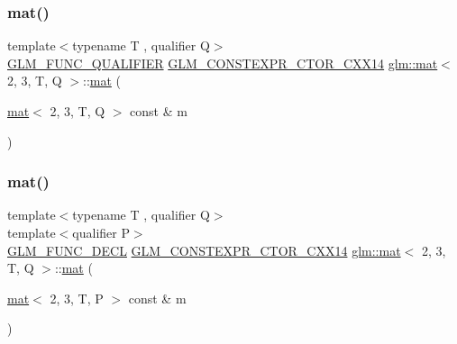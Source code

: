\subsubsection{\texorpdfstring{mat()}{mat()}\hspace{0.1cm}{\footnotesize\ttfamily [2/21]}}
{\footnotesize\ttfamily template$<$typename T , qualifier Q$>$ \\
\hyperlink{setup_8hpp_a33fdea6f91c5f834105f7415e2a64407}{G\+L\+M\+\_\+\+F\+U\+N\+C\+\_\+\+Q\+U\+A\+L\+I\+F\+I\+ER} \hyperlink{setup_8hpp_a0900f9145e68bf6061b6f5e7be3fa751}{G\+L\+M\+\_\+\+C\+O\+N\+S\+T\+E\+X\+P\+R\+\_\+\+C\+T\+O\+R\+\_\+\+C\+X\+X14} \hyperlink{structglm_1_1mat}{glm\+::mat}$<$ 2, 3, T, Q $>$\+::\hyperlink{structglm_1_1mat}{mat} (\begin{DoxyParamCaption}\item[{\hyperlink{structglm_1_1mat}{mat}$<$ 2, 3, T, Q $>$ const \&}]{m }\end{DoxyParamCaption})}

\mbox{\label{structglm_1_1mat_3_012_00_013_00_01_t_00_01_q_01_4_abeb4c8e27fcf703c9944917ee1a10887}} 
\subsubsection{\texorpdfstring{mat()}{mat()}\hspace{0.1cm}{\footnotesize\ttfamily [3/21]}}
{\footnotesize\ttfamily template$<$typename T , qualifier Q$>$ \\
template$<$qualifier P$>$ \\
\hyperlink{setup_8hpp_ab2d052de21a70539923e9bcbf6e83a51}{G\+L\+M\+\_\+\+F\+U\+N\+C\+\_\+\+D\+E\+CL} \hyperlink{setup_8hpp_a0900f9145e68bf6061b6f5e7be3fa751}{G\+L\+M\+\_\+\+C\+O\+N\+S\+T\+E\+X\+P\+R\+\_\+\+C\+T\+O\+R\+\_\+\+C\+X\+X14} \hyperlink{structglm_1_1mat}{glm\+::mat}$<$ 2, 3, T, Q $>$\+::\hyperlink{structglm_1_1mat}{mat} (\begin{DoxyParamCaption}\item[{\hyperlink{structglm_1_1mat}{mat}$<$ 2, 3, T, P $>$ const \&}]{m }\end{DoxyParamCaption})}

\mbox{\label{structglm_1_1mat_3_012_00_013_00_01_t_00_01_q_01_4_a0272cfd68549b264d67a275e6bdd8553}} 

